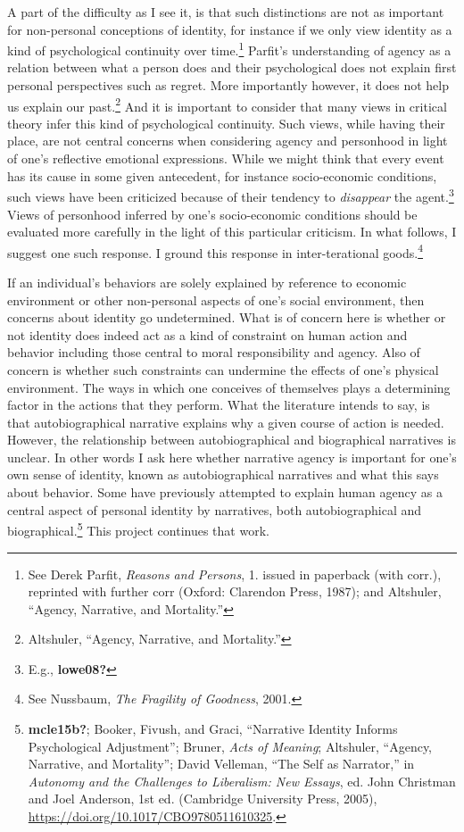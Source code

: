 \documentclass[phdthesis,12pt,final]{wuthesis}
\theoremstyle{definition}
\theoremstyle{definition}
\theoremstyle{definition}
\theoremstyle{definition}
\theoremstyle{remark}
\begin{document}
A part of the difficulty as I see it, is that such distinctions are not as important for non-personal conceptions of identity, for instance if we only view identity as a kind of psychological continuity over time.\footnote{See Derek Parfit, \emph{Reasons and Persons}, 1. issued in paperback (with corr.), reprinted with further corr (Oxford: Clarendon Press, 1987); and Altshuler, {``Agency, Narrative, and Mortality.''}} Parfit's understanding of agency as a relation between what a person does and their psychological does not explain first personal perspectives such as regret. More importantly however, it does not help us explain our past.\footnote{Altshuler, {``Agency, Narrative, and Mortality.''}} And it is important to consider that many views in critical theory infer this kind of psychological continuity. Such views, while having their place, are not central concerns when considering agency and personhood in light of one's reflective emotional expressions. While we might think that every event has its cause in some given antecedent, for instance socio-economic conditions, such views have been criticized because of their tendency to \emph{disappear} the agent.\footnote{E.g., \textbf{lowe08?}} Views of personhood inferred by one's socio-economic conditions should be evaluated more carefully in the light of this particular criticism. In what follows, I suggest one such response. I ground this response in inter-terational goods.\footnote{See Nussbaum, \emph{The {Fragility} of {Goodness}}, 2001.}

If an individual's behaviors are solely explained by reference to economic environment or other non-personal aspects of one's social environment, then concerns about identity go undetermined. What is of concern here is whether or not identity does indeed act as a kind of constraint on human action and behavior including those central to moral responsibility and agency. Also of concern is whether such constraints can undermine the effects of one's physical environment. The ways in which one conceives of themselves plays a determining factor in the actions that they perform. What the literature intends to say, is that autobiographical narrative explains why a given course of action is needed. However, the relationship between autobiographical and biographical narratives is unclear. In other words I ask here whether narrative agency is important for one's own sense of identity, known as autobiographical narratives and what this says about behavior. Some have previously attempted to explain human agency as a central aspect of personal identity by narratives, both autobiographical and biographical.\footnote{\textbf{mcle15b?}; Booker, Fivush, and Graci, {``Narrative Identity Informs Psychological Adjustment''}; Bruner, \emph{Acts of Meaning}; Altshuler, {``Agency, Narrative, and Mortality''}; David Velleman, {``The {Self} as {Narrator},''} in \emph{Autonomy and the {Challenges} to {Liberalism}: {New Essays}}, ed. John Christman and Joel Anderson, 1st ed. (Cambridge University Press, 2005), \url{https://doi.org/10.1017/CBO9780511610325}.} This project continues that work.
\end{document}
